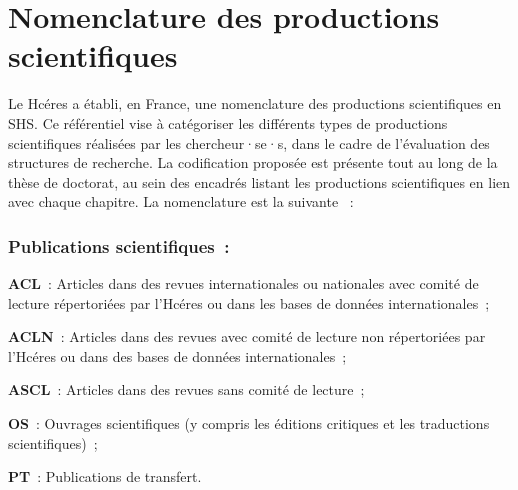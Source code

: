 \section*{Nomenclature des productions scientifiques
    \label{subbody:nomenclature-productions-scientifiques}
    }

Le \acrfull{Hcéres} a établi, en France, une nomenclature des productions scientifiques en \acrfull{SHS}. Ce référentiel vise à catégoriser les différents types de productions scientifiques réalisées par les chercheur·se·s, dans le cadre de l'évaluation des structures de recherche. La codification proposée est présente tout au long de la thèse de doctorat, au sein des encadrés listant les productions scientifiques en lien avec chaque chapitre. La nomenclature est la suivante \textcolor{blue}{\autocite{ministere_de_leducation_nationale_de_lenseignement_superieur_et_de_la_recherche_nomenclatures_nodate}}~:%

\subsubsection*{Publications scientifiques~:}
    \begin{customitemize}
\item \textbf{ACL}~: Articles dans des revues internationales ou nationales avec comité de lecture répertoriées par l'Hcéres ou dans les bases de données internationales~;
\item \textbf{ACLN}~: Articles dans des revues avec comité de lecture non répertoriées par l'Hcéres ou dans des bases de données internationales~;
\item \textbf{ASCL}~: Articles dans des revues sans comité de lecture~;
\item \textbf{OS}~: Ouvrages scientifiques (y compris les éditions critiques et les traductions scientifiques)~;
\item \textbf{PT}~: Publications de transfert.
    \end{customitemize}%


